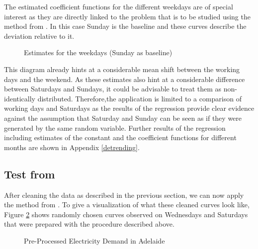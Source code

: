 \documentclass[12pt, a4paper]{article}
\theoremstyle{MAstyle} \newtheorem{assumption}{Assumption}[section]
\theoremstyle{MAstyle} \newtheorem{definition}{Definition}[section]
\theoremstyle{MAstyle} \newtheorem{theorem}{Theorem}[section]
\begin{document}
			The estimated coefficient functions for the different weekdays are of special interest as they are directly linked to the problem that is to be studied using the method from \cite{bugni_permutation_2021}. In this case Sunday is the baseline and these curves describe the deviation relative to it.
			\begin{figure}[H]
				\caption{Estimates for the weekdays (Sunday as baseline)}
				\label{estimates_weekdays}
			\end{figure}
			This diagram already hints at a considerable mean shift between the working days and the weekend. As these estimates also hint at a considerable difference between Saturdays and Sundays, it could be advisable to treat them as non-identically distributed. Therefore,the application is limited to a comparison of working days and Saturdays as the results of the regression provide clear evidence against the assumption that Saturday and Sunday can be seen as if they were generated by the same random variable.
			Further results of the regression including estimates of the constant and the coefficient functions for different months are shown in Appendix \ref{detrending}.
			
		\subsection{Test from \cite{bugni_permutation_2021}}
			After cleaning the data as described in the previous section, we can now apply the method from \cite{bugni_permutation_2021}.
			To give a visualization of what these cleaned curves look like, Figure \ref{electricity_demand_cleaned} shows randomly chosen curves observed on Wednesdays and Saturdays that were prepared with the procedure described above.
			
			\begin{figure}[H]
				\caption{Pre-Processed Electricity Demand in Adelaide}
				\label{electricity_demand_cleaned}
			\end{figure}
			
\end{document}
